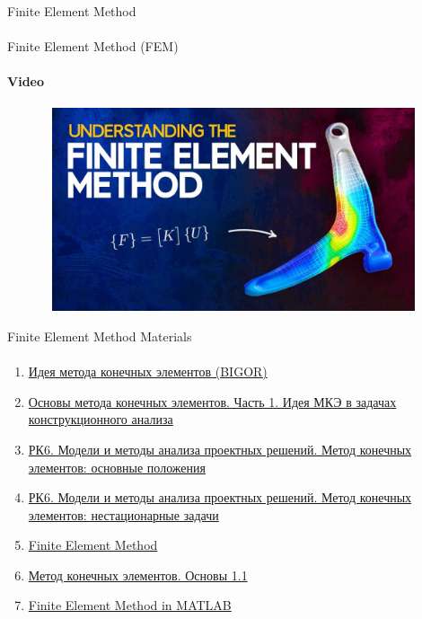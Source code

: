\documentclass[aspectratio=169]{beamer}
\begin{document}
\begin{frame}[t]{Finite Element Method}
    \framesubtitle{}

\end{frame}

\begin{frame}[t]{Finite Element Method (FEM)}
    \framesubtitle{Video}
    \vspace{-0.6cm}
    \begin{figure}[H]
        \href{https://youtu.be/GHjopp47vvQ}{
            \centering\includegraphics[height=6cm,width=1\textwidth,keepaspectratio]{fem_video.jpg}}
        \label{fig:fem_video.jpg}
    \end{figure}
\end{frame}

\begin{frame}[t]{Finite Element Method Materials}
    \framesubtitle{}
    \scriptsize
    \begin{enumerate}
        \item \href{http://bigor.bmstu.ru/?cnt/?doc=Mkr/id-fem.mod/?cou=Mkr/base.cou}{Идея метода конечных элементов (BIGOR)}
        \item \href{https://www.youtube.com/watch?v=W-llrHRydv8&list=PL0GvilEBvQdZH_PqDTilH9Hmp_--dWB33 }{Основы метода конечных элементов. Часть 1. Идея МКЭ в задачах конструкционного анализа}
        \item \href{https://www.youtube.com/watch?v=BA4iZtRfNxE&list=PLtaqFZsfPcLkas_BCVyqmVFGtNIzm9hg8&index=15}{РК6. Модели и методы анализа проектных решений. Метод конечных элементов: основные положения}
        \item \href{https://www.youtube.com/watch?v=KcrRM_22RjY}{РК6. Модели и методы анализа проектных решений. Метод конечных элементов: нестационарные задачи}
        \item \href{https://youtu.be/P4lBRuY7pC4}{Finite Element Method}
        \item \href{https://www.youtube.com/playlist?list=PL4__wpEQFpcjPZQ76CCcEmBaum5Iky4H3}{Метод конечных элементов. Основы 1.1}
        \item \href{https://www.youtube.com/playlist?list=PLnT2pATp7adU_OYwrPoDWE_YmePxu-fMf}{Finite Element Method in MATLAB}

    \end{enumerate}
\end{frame}
\end{document}
